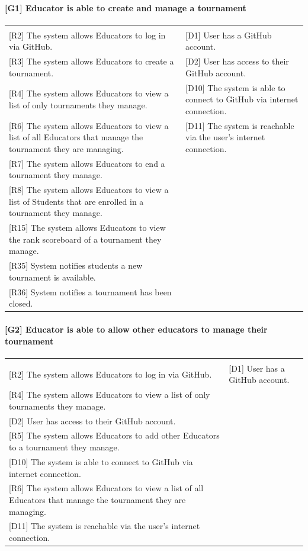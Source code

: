 \documentclass{article}
\begin{document}
\paragraph{[G1] Educator is able to create and manage a tournament}
\begin{center}
\begin{tabular}{|m{20em}|m{20em}|}
\hline
& \\
{[R2]} The system allows Educators to log in via GitHub. &
{[D1]} User has a GitHub account.\\
{[R3]} The system allows Educators to create a tournament. &
{[D2]} User has access to their GitHub account.\\
{[R4]} The system allows Educators to view a list of only tournaments they manage. &
[D10] The system is able to connect to GitHub via internet connection.\\
{[R6]} The system allows Educators to view a list of all Educators that manage the tournament they are managing. &
[D11] The system is reachable via the user’s internet connection.\\
{[R7]} The system allows Educators to end a tournament they manage. & \\
{[R8]} The system allows Educators to view a list of Students that are enrolled in a tournament they manage. & \\
{[R15]} The system allows Educators to view the rank scoreboard of a tournament they manage. & \\
{[R35]} System notifies students a new tournament is available.  & \\
{[R36]} System notifies a tournament has been closed. & \\
\hline
\end{tabular}
\end{center}

\paragraph{[G2] Educator is able to allow other educators to manage their tournament}
\begin{center}
\begin{tabular}{|m{20em}|m{20em}|}
\hline
& \\
{[R2]} The system allows Educators to log in via GitHub. &
{[D1]} User has a GitHub account.\\
{[R4]} The system allows Educators to view a list of only tournaments they manage. &  \\
{[D2]} User has access to their GitHub account.\\
{[R5]} The system allows Educators to add other Educators to a tournament they manage. &  \\
{[D10]} The system is able to connect to GitHub via internet connection.\\
{[R6]} The system allows Educators to view a list of all Educators that manage the tournament they are managing. &  \\
{[D11]} The system is reachable via the user's internet connection.\\
\hline
\end{tabular}
\end{center}
\end{document}
